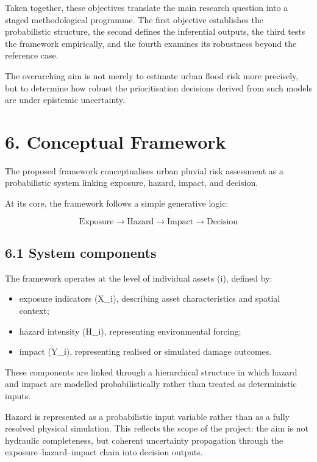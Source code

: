 \documentclass[
]{article}
\providecommand{\tightlist}{%
  \setlength{\itemsep}{0pt}\setlength{\parskip}{0pt}}
\begin{document}
Taken together, these objectives translate the main research question
into a staged methodological programme. The first objective establishes
the probabilistic structure, the second defines the inferential outputs,
the third tests the framework empirically, and the fourth examines its
robustness beyond the reference case.

The overarching aim is not merely to estimate urban flood risk more
precisely, but to determine how robust the prioritisation decisions
derived from such models are under epistemic uncertainty.

\section{6. Conceptual Framework}\label{conceptual-framework}

The proposed framework conceptualises urban pluvial risk assessment as a
probabilistic system linking exposure, hazard, impact, and decision.

At its core, the framework follows a simple generative logic:

\[
\text{Exposure} \rightarrow \text{Hazard} \rightarrow \text{Impact} \rightarrow \text{Decision}
\]

\subsection{6.1 System components}\label{system-components}

The framework operates at the level of individual assets (i), defined
by:

\begin{itemize}
\tightlist
\item
  exposure indicators (X\_i), describing asset characteristics and
  spatial context;
\item
  hazard intensity (H\_i), representing environmental forcing;
\item
  impact (Y\_i), representing realised or simulated damage outcomes.
\end{itemize}

These components are linked through a hierarchical structure in which
hazard and impact are modelled probabilistically rather than treated as
deterministic inputs.

Hazard is represented as a probabilistic input variable rather than as a
fully resolved physical simulation. This reflects the scope of the
project: the aim is not hydraulic completeness, but coherent uncertainty
propagation through the exposure--hazard--impact chain into decision
outputs.
\end{document}
